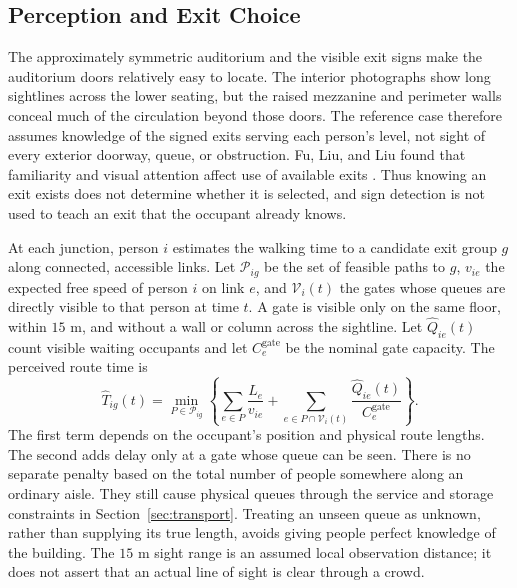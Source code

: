 \documentclass[11pt,a4paper]{article}
\begin{document}
\subsection{Perception and Exit Choice}

The approximately symmetric auditorium and the visible exit signs make the auditorium doors relatively easy to locate. The interior photographs show long sightlines across the lower seating, but the raised mezzanine and perimeter walls conceal much of the circulation beyond those doors. The reference case therefore assumes knowledge of the signed exits serving each person's level, not sight of every exterior doorway, queue, or obstruction. Fu, Liu, and Liu found that familiarity and visual attention affect use of available exits \cite{fu2023,fu2024}. Thus knowing an exit exists does not determine whether it is selected, and sign detection is not used to teach an exit that the occupant already knows.

At each junction, person $i$ estimates the walking time to a candidate exit group $g$ along connected, accessible links. Let $\mathcal P_{ig}$ be the set of feasible paths to $g$, $v_{ie}$ the expected free speed of person $i$ on link $e$, and $\mathcal V_i(t)$ the gates whose queues are directly visible to that person at time $t$. A gate is visible only on the same floor, within $15$ m, and without a wall or column across the sightline. Let $\widehat Q_{ie}(t)$ count visible waiting occupants and let $C_e^{\mathrm{gate}}$ be the nominal gate capacity. The perceived route time is
\begin{equation}\label{eq:perceived}
\widehat T_{ig}(t)=\min_{P\in\mathcal P_{ig}}
\left\{\sum_{e\in P}\frac{L_e}{v_{ie}}+
\sum_{e\in P\cap\mathcal V_i(t)}\frac{\widehat Q_{ie}(t)}{C_e^{\mathrm{gate}}}\right\}.
\end{equation}
The first term depends on the occupant's position and physical route lengths. The second adds delay only at a gate whose queue can be seen. There is no separate penalty based on the total number of people somewhere along an ordinary aisle. They still cause physical queues through the service and storage constraints in Section~\ref{sec:transport}. Treating an unseen queue as unknown, rather than supplying its true length, avoids giving people perfect knowledge of the building. The $15$ m sight range is an assumed local observation distance; it does not assert that an actual line of sight is clear through a crowd.
\end{document}
